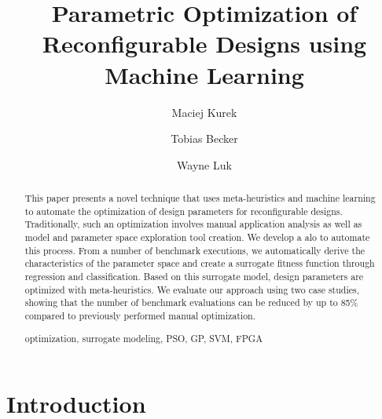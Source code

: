 \documentclass[runningheads,a4paper]{llncs}
\newcommand{\keywords}[1]{\par\addvspace\baselineskip
\noindent\keywordname\enspace\ignorespaces#1}
\begin{document}
\mainmatter  %

\title{Parametric Optimization of Reconfigurable Designs using Machine Learning}


%
%
\author{Maciej Kurek \and Tobias Becker \and Wayne Luk}
%


\maketitle


\begin{abstract}


This paper presents a novel technique that uses meta-heuristics and machine learning to automate the optimization of design parameters for reconfigurable designs. Traditionally, such an optimization involves manual application analysis as well as model and parameter space exploration tool creation. We develop a \ac{alo} to automate this process. From a number of benchmark executions, we automatically derive the characteristics of the parameter space and create a surrogate fitness function through regression and classification. Based on this surrogate model, design parameters are optimized with meta-heuristics. We evaluate our approach using two case studies, showing that the number of benchmark evaluations can be reduced by up to 85\% compared to previously performed manual optimization.


\keywords{optimization, surrogate modeling, PSO, GP, SVM, FPGA}

\end{abstract}

\section{Introduction}
\end{document}
